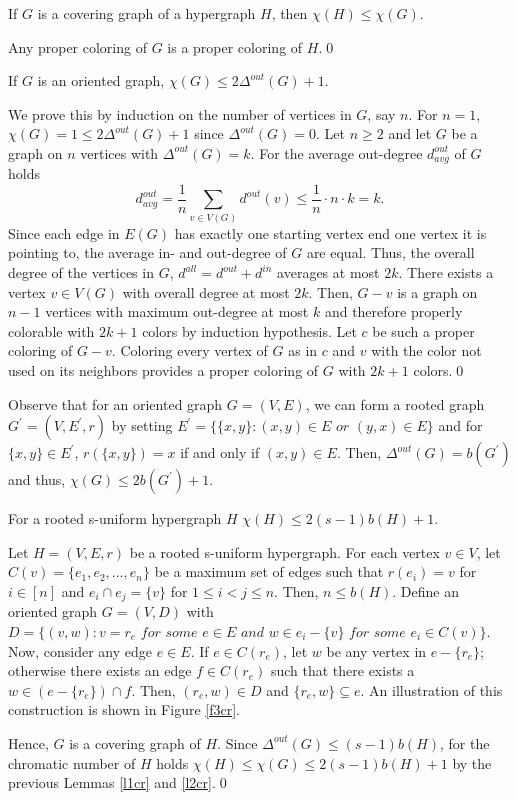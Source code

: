 \begin{lemma}\label{l1cr}
If $G$ is a covering graph of a hypergraph $H$, then $\chi (H)\leq\chi (G)$.
\end{lemma}
\begin{prf}
Any proper coloring of $G$ is a proper coloring of $H$.\qed
\end{prf}

\begin{lemma}\label{l2cr}
If $G$ is an oriented graph, $\chi (G)\leq 2\Delta^{out}(G) +1$.
\end{lemma}
\begin{prf}
We prove this by induction on the number of vertices in $G$, say $n$. For $n=1$, $\chi (G) =1\leq 2\Delta^{out}(G) +1$ since $\Delta^{out}(G)=0$.
Let $n\geq 2$ and let $G$ be a graph on $n$ vertices with $\Delta^{out}(G)=k$. For the average out-degree $d_{avg}^{out}$ of $G$ holds \[d_{avg}^{out}=\dfrac{1}{n}\sum_{v\in V(G)}d^{out}(v)\leq\dfrac{1}{n} \cdot n\cdot k=k.\] Since each edge in $E(G)$ has exactly one starting vertex end one vertex it is pointing to, the average in- and out-degree of $G$ are equal. Thus, the overall degree of the vertices in $G$, $d^{all}=d^{out}+d^{in}$ averages at most $2k$. There exists a vertex $v\in V(G)$ with overall degree at most $2k$. Then, $G-v$ is a graph on $n-1$ vertices with maximum out-degree at most $k$ and therefore properly colorable with $2k+1$ colors by induction hypothesis. Let $c$ be such a proper coloring of $G-v$. Coloring every vertex of $G$ as in $c$ and $v$ with the color not used on its neighbors provides a proper coloring of $G$ with $2k+1$ colors.\qed
\end{prf}

Observe that for an oriented graph $G=(V,E)$, we can form a rooted graph $G^\prime =(V,E^\prime ,r)$ by setting $E^\prime =\{\{ x,y\} :(x,y)\in E \textit{ or } (y,x)\in E\}$ and for $\{ x,y\}\in E^\prime$, $r(\{ x,y\} )=x$ if and only if $(x,y)\in E$. Then, $\Delta^{out}(G)=b(G^\prime )$ and thus, $\chi (G)\leq 2b(G^\prime ) +1$.

\begin{lemma}\label{l3cr}
For a rooted s-uniform hypergraph $H$ $\chi (H)\leq 2(s-1)b(H) +1$.
\end{lemma}
\begin{prf}
Let $H=(V,E,r)$ be a rooted s-uniform hypergraph. For each vertex $v\in V$, let $C(v)=\{ e_1,e_2,\dots ,e_n\}$ be a maximum set of edges such that $r(e_i)=v$ for $i\in [n]$ and $e_i\cap e_j = \{ v\}$ for $1\leq i<j\leq n$. Then, $n\leq b(H)$. Define an oriented graph $G=(V,D)$ with $D=\{(v,w): v =r_e \textit{ for some } e\in E\textit{ and } w\in e_i -\{v\} \textit{ for some } e_i\in C(v)\}$. Now, consider any edge $e\in E$. If $e\in C(r_e)$, let $w$ be any vertex in $e-\{ r_e\}$; otherwise there exists an edge $f\in C(r_e)$ such that there exists a $w\in (e-\{ r_e\})\cap f$. Then, $(r_e,w)\in D$ and $\{r_e,w\}\subseteq e$. An illustration of this construction is shown in Figure \ref{f3cr}.

Hence, $G$ is a covering graph of $H$. Since $\Delta^{out}(G)\leq (s-1)b(H)$, for the chromatic number of $H$ holds $\chi (H)\leq\chi (G)\leq 2(s-1)b(H) +1$ by the previous Lemmas \ref{l1cr} and \ref{l2cr}.\qed
\end{prf}

